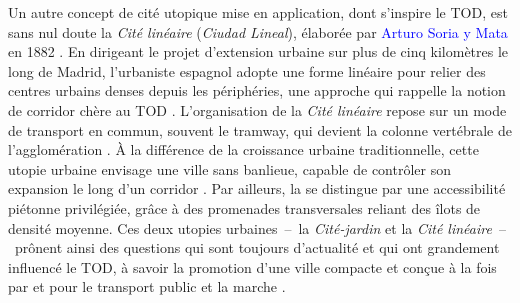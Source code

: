 \begin{refsegment}
Un autre concept de cité utopique mise en application, dont s’inspire le \acrshort{TOD}, est sans nul doute la \textsl{Cité linéaire} (\textsl{Ciudad Lineal}), élaborée par \textcolor{blue}{Arturo Soria y Mata} en 1882 \textcolor{blue}{\autocite{lemelson_center_george_2014}}. En dirigeant le projet d’extension urbaine sur plus de cinq kilomètres le long de Madrid, l’urbaniste espagnol adopte une forme linéaire pour relier des centres urbains denses depuis les périphéries, une approche qui rappelle la notion de corridor chère au \acrshort{TOD} \textcolor{blue}{\autocite[348]{lopez_rodriguez_arturo_2017}}. L’organisation de la \textsl{Cité linéaire} repose sur un mode de transport en commun, souvent le tramway, qui devient la colonne vertébrale de l’agglomération \textcolor{blue}{\autocite{lemelson_center_george_2014}}. À la différence de la croissance urbaine traditionnelle, cette utopie urbaine envisage une ville sans banlieue, capable de contrôler son expansion le long d'un corridor \textcolor{blue}{\autocite[722]{furundzic_infrastructure_2012}}. Par ailleurs, la  se distingue par une accessibilité piétonne privilégiée, grâce à des promenades transversales reliant des îlots de densité moyenne. Ces deux utopies urbaines~–~la \textsl{Cité-jardin} et la \textsl{Cité linéaire}~–~prônent ainsi des questions qui sont toujours d'actualité et qui ont grandement influencé le \acrshort{TOD}, à savoir la promotion d'une ville compacte et conçue à la fois par et pour le transport public et la marche \textcolor{blue}{\autocite[11]{salomon_cavin_cites-jardins_2007}}.%


\end{refsegment}
